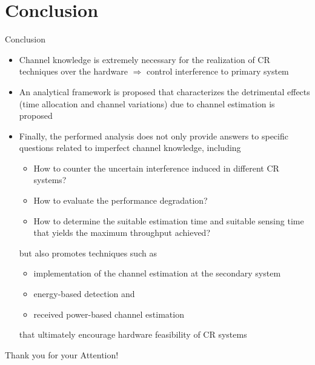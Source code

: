 \documentclass[16pt]{beamer}
\newcommand{\fs}[2]{\fontsize{#1 pt}{#2}\selectfont}
\begin{document}
\section{Conclusion}
\begin{frame}[c]{Conclusion}
	\begin{block}{}
	\fs{7}{9}
		\begin{itemize}	
			\item Channel knowledge is extremely necessary for the realization of CR techniques over the hardware $\Rightarrow$ control interference to primary system
			\item An analytical framework is proposed that characterizes the detrimental effects (time allocation and channel variations) due to channel estimation is proposed 
			\item Finally, the performed analysis does not only provide answers to specific questions related to imperfect channel knowledge, including 
				\begin{itemize} 
				\fs{7}{9}
\item How to counter the uncertain interference induced in different CR systems? \item How to evaluate the performance degradation? \item How to determine the suitable estimation time and suitable sensing time that yields the maximum throughput achieved? \end{itemize}
but also promotes techniques such as 

\begin{itemize} 
\fs{7}{9}
\item implementation of the channel estimation at the secondary system \item energy-based detection and \item received power-based channel estimation \end{itemize} that ultimately encourage hardware feasibility of CR systems
 
		\end{itemize} 
	\end{block}
\end{frame}

\begin{frame}[c]{}
\begin{center}
Thank you for your Attention!
\end{center}
\end{frame}
\end{document}
